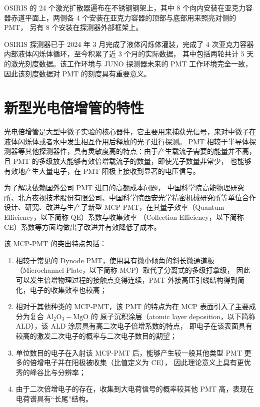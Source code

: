 OSIRIS 的 24 个激光扩散器遍布在不锈钢钢架上，其中 8 个向内安装在亚克力容器赤道平面上，两侧各 4 个安装在亚克力容器的顶部与底部用来照亮对侧的 PMT，
另有 8 个安装在探测器外部框架上。

OSIRIS 探测器已于 2024 年 3 月完成了液体闪烁体灌装，完成了 4 次亚克力容器内部液体闪烁体循环，至今积累了近 3 个月的实际数据，
其中包括两轮共计 5 天的激光刻度数据。该工作环境与 JUNO 探测器未来的 PMT 工作环境完全一致，因此该刻度数据对 PMT 的刻度具有重要意义。

\section{新型光电倍增管的特性}
光电倍增管是大型中微子实验的核心器件，它主要用来捕获光信号，来对中微子在液体闪烁体或者水中发生相互作用后释放的光子进行探测。
PMT 相较于半导体探测器等其他探测器件，具有灵敏度高的特点：由于产生载流子需要的能量并不高，
且 PMT 的多级放大能够有效倍增载流子的数量，即使光子数量非常少，
也能够有效地产生大量电子，在 PMT 阳极上接收到显著的电压信号。

为了解决依赖国外公司 PMT 进口的高额成本问题，
中国科学院高能物理研究所、北方夜视技术股份有限公司、中国科学院西安光学精密机械研究所等单位合作
设计、研究、改进与生产了新型 MCP-PMT，在其量子效率（Quantum Efficiency，以下简称 QE）系数与收集效率
（Collection Efficiency，以下简称 CE）系数等方面均做出了改进并有效降低了成本。

该 MCP-PMT 的突出特点包括：
\begin{enumerate}
    \item 相较于常见的 Dynode PMT，使用具有微小倾角的斜长微通道板（Microchannel Plate，以下简称 MCP）取代了分离式的多级打拿级，
    因此可以发生倍增物理过程的接触点变得连续，PMT 外接高压引线结构得到简化，电子的收集效率也较高；
    \item 相对于其他种类的 MCP-PMT，该 PMT 的特点为在 MCP 表面引入了主要成分为复合 $\text{Al}_2\text{O}_3-\text{MgO}$ 的
    原子沉积涂层（atomic layer deposition，以下简称 ALD），该 ALD 涂层具有高二次电子倍增系数的特点，
    即电子在该表面具有较高的激发二次电子的概率与二次电子数目的期望；
    \item 单位数目的电子在入射该 MCP-PMT 后，能够产生较一般其他类型 PMT 更多的倍增电子并在阳极被收集（比值定义为 CE），
    因此理论意义上具有更优秀的峰谷比与分辨率；
    \item 由于二次倍增电子的存在，收集到大电荷信号的概率较其他 PMT 高，表现在电荷谱具有“长尾”结构。
\end{enumerate}


